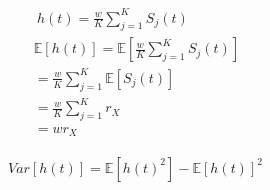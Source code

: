 \documentclass{article}
\begin{document}
\begin{align*}
\
h(t) = \frac{w}{K} \sum_{j = 1}^{K} S_{j}(t) \\
\mathbb{E}[h(t)] = \mathbb{E}[\frac{w}{K} \sum_{j = 1}^{K} S_{j}(t)] \\
= \frac{w}{K} \sum_{j = 1}^{K} \mathbb{E}[S_{j}(t)]\\
= \frac{w}{K} \sum_{j = 1}^{K} r_{X} \\
= wr_{X} 
\
\end{align*}

\begin{align*}

Var[h(t)] = \mathbb{E}[h(t)^2] - \mathbb{E}[h(t)]^2
\
\end{align*}





\end{document}
